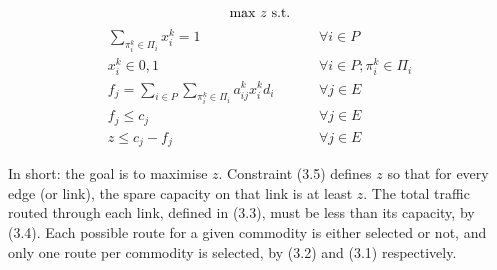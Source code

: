 \begin{equation*}
	\text{max } z \text{ s.t.} \\
\end{equation*}
\begin{align}
	\sum_{\pi_i^k \in \Pi_i} x_i^k = 1 \hspace{1cm} &\forall i \in P \\
	x_i^k \in {0,1} \hspace{1cm} &\forall i \in P; \pi_i^k \in \Pi_i \\
	f_j = \sum_{i \in P} \sum_{\pi_i^k \in \Pi_i} a_{ij}^k x_i^k d_i \hspace{1cm} &\forall j \in E \\
	f_j \leq c_j \hspace{1cm} &\forall j \in E \\
	z \leq c_j - f_j \hspace{1cm} &\forall j \in E
\end{align}

In short: the goal is to maximise $z$. Constraint (3.5) defines $z$ so that for every edge (or link), the spare capacity on that link is at least $z$. The total traffic routed through each link, defined in (3.3), must be less than its capacity, by (3.4). Each possible route for a given commodity is either selected or not, and only one route per commodity is selected, by (3.2) and (3.1) respectively.


